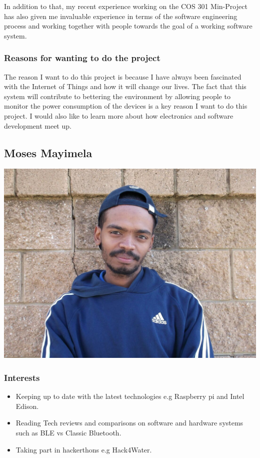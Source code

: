 \documentclass[a4paper,12pt]{article}
\begin{document}
In addition to that, my recent experience working on the COS 301 Min-Project has also given me invaluable experience in terms of the software engineering process and working together with people towards the goal of a working software system.
\subsubsection{Reasons for wanting to do the project}
The reason  I want to do this project is because I have always been fascinated with the Internet of Things and how it will change our lives. The fact that this system will contribute to bettering the environment by allowing people to monitor the power consumption of the devices is a key reason I want to do this project. I would also like to learn more about how electronics and software development meet up.
\newpage
\subsection{Moses Mayimela}
\includegraphics[width=\textwidth]{images/Moses}
\subsubsection{Interests}
\begin{itemize}
\item Keeping up to date with the latest technologies e.g Raspberry pi and Intel Edison.
\item Reading Tech reviews and comparisons on software and hardware systems such as BLE vs Classic Bluetooth.
\item Taking part in hackerthons e.g Hack4Water.
\end{itemize}
\end{document}
